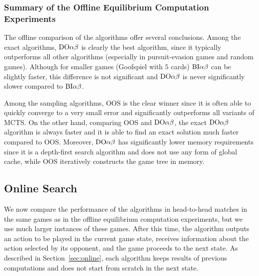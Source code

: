 \subsubsection{Summary of the Offline Equilibrium Computation Experiments}

The offline comparison of the algorithms offer several conclusions.
Among the exact algorithms, $\textrm{DO}\alpha\beta$ is clearly the best algorithm, since it typically outperforms all other algorithms (especially in pursuit-evasion games and random games). Although for smaller games (\eg Goofspiel with $5$ cards)  $\textrm{BI}\alpha\beta$ can be slightly faster, this difference is not significant and $\textrm{DO}\alpha\beta$ is never significantly slower compared to $\textrm{BI}\alpha\beta$. %

Among the sampling algorithms, OOS is the clear winner since it is often able to quickly converge to a very small error and significantly outperforms all variants of MCTS.
On the other hand, comparing OOS and $\textrm{DO}\alpha\beta$, the exact $\textrm{DO}\alpha\beta$ algorithm is always faster and it is able to find an exact solution much faster compared to OOS.
Moreover, $\textrm{DO}\alpha\beta$ has significantly lower memory requirements since it is a depth-first search algorithm and does not use any form of global cache, while OOS iteratively constructs the game tree in memory.

\subsection{Online Search}

We now compare the performance of the algorithms in head-to-head matches in the same games as in the offline equilibrium computation experiments, but we use much larger instances of these games.  After this time, the algorithm outputs an action to be played in the current game state, receives information about the action selected by its opponent, and the game proceeds to the next state. As described in Section~\ref{sec:online}, each algorithm keeps results of previous computations and does not start from scratch in the next state. 


